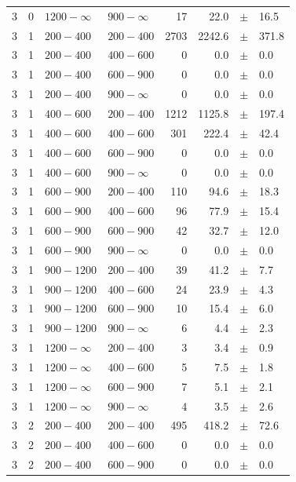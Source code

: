 \begin{table}[!h]
\begin{tabular}{rrllrrcl}
3 & 0 & $1200- \infty$ & $900-\infty$ &     17 &     22.0 &$\pm$&   16.5 \\
3 & 1 & $ 200- 400$ & $200-400$ &   2703 &   2242.6 &$\pm$&  371.8 \\
3 & 1 & $ 200- 400$ & $400-600$ &      0 &      0.0 &$\pm$&    0.0 \\
3 & 1 & $ 200- 400$ & $600-900$ &      0 &      0.0 &$\pm$&    0.0 \\
3 & 1 & $ 200- 400$ & $900-\infty$ &      0 &      0.0 &$\pm$&    0.0 \\
3 & 1 & $ 400- 600$ & $200-400$ &   1212 &   1125.8 &$\pm$&  197.4 \\
3 & 1 & $ 400- 600$ & $400-600$ &    301 &    222.4 &$\pm$&   42.4 \\
3 & 1 & $ 400- 600$ & $600-900$ &      0 &      0.0 &$\pm$&    0.0 \\
3 & 1 & $ 400- 600$ & $900-\infty$ &      0 &      0.0 &$\pm$&    0.0 \\
3 & 1 & $ 600- 900$ & $200-400$ &    110 &     94.6 &$\pm$&   18.3 \\
3 & 1 & $ 600- 900$ & $400-600$ &     96 &     77.9 &$\pm$&   15.4 \\
3 & 1 & $ 600- 900$ & $600-900$ &     42 &     32.7 &$\pm$&   12.0 \\
3 & 1 & $ 600- 900$ & $900-\infty$ &      0 &      0.0 &$\pm$&    0.0 \\
3 & 1 & $ 900-1200$ & $200-400$ &     39 &     41.2 &$\pm$&    7.7 \\
3 & 1 & $ 900-1200$ & $400-600$ &     24 &     23.9 &$\pm$&    4.3 \\
3 & 1 & $ 900-1200$ & $600-900$ &     10 &     15.4 &$\pm$&    6.0 \\
3 & 1 & $ 900-1200$ & $900-\infty$ &      6 &      4.4 &$\pm$&    2.3 \\
3 & 1 & $1200- \infty$ & $200-400$ &      3 &      3.4 &$\pm$&    0.9 \\
3 & 1 & $1200- \infty$ & $400-600$ &      5 &      7.5 &$\pm$&    1.8 \\
3 & 1 & $1200- \infty$ & $600-900$ &      7 &      5.1 &$\pm$&    2.1 \\
3 & 1 & $1200- \infty$ & $900-\infty$ &      4 &      3.5 &$\pm$&    2.6 \\
3 & 2 & $ 200- 400$ & $200-400$ &    495 &    418.2 &$\pm$&   72.6 \\
3 & 2 & $ 200- 400$ & $400-600$ &      0 &      0.0 &$\pm$&    0.0 \\
3 & 2 & $ 200- 400$ & $600-900$ &      0 &      0.0 &$\pm$&    0.0 \\

\end{tabular}
\end{table}
